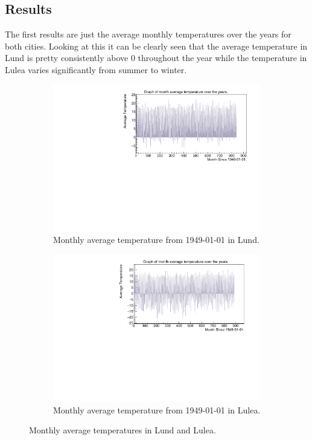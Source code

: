 \documentclass[aps,prl,groupedaddress,twocolumn]{revtex4-1}
\begin{document}
\subsection{Results}
The first results are just the average monthly temperatures over the years for both cities. Looking at this it can be clearly seen that the average temperature in Lund is pretty consistently above 0 throughout the year while the temperature in Lulea varies significantly from summer to winter.
\begin{figure}[h!]
    \begin{subfigure}{0.45\textwidth}
            \includegraphics[width=\textwidth]{monthlyAverageTemperatureLund.pdf}
            \caption{Monthly average temperature from 1949-01-01 in Lund.}
            \label{fig:monthlyLund}
    \end{subfigure}
    \hfill
    \begin{subfigure}{0.45\textwidth}
            \includegraphics[width=\textwidth]{monthlyAverageTemperatureLulea.pdf}
            \caption{Monthly average temperature from 1949-01-01 in Lulea.}
            \label{fig:monthlyLulea}
    \end{subfigure}
    \caption{Monthly average temperatures in Lund and Lulea.}
    \label{fig:monthlyTemp}
\end{figure}
\end{document}
